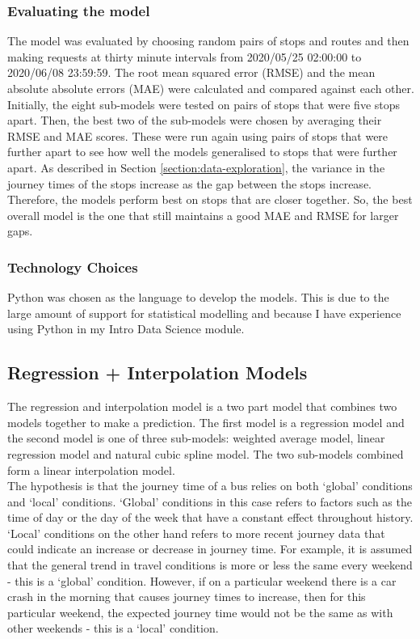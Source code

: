 \subsubsection{Evaluating the model}

The model was evaluated by choosing random pairs of stops and routes and then making requests at thirty minute intervals from 2020/05/25 02:00:00 to 2020/06/08 23:59:59. The root mean squared error (RMSE) and the mean absolute absolute errors (MAE) were calculated and compared against each other. \\

Initially, the eight sub-models were tested on pairs of stops that were five stops apart. Then, the best two of the sub-models were chosen by averaging their RMSE and MAE scores. These were run again using pairs of stops that were further apart to see how well the models generalised to stops that were further apart. As described in Section \ref{section:data-exploration}, the variance in the journey times of the stops increase as the gap between the stops increase. Therefore, the models perform best on stops that are closer together. So, the best overall model is the one that still maintains a good MAE and RMSE for larger gaps.

\subsubsection{Technology Choices}

Python was chosen as the language to develop the models. This is due to the large amount of support for statistical modelling and because I have experience using Python in my Intro Data Science module.

\subsection{Regression + Interpolation Models}

The regression and interpolation model is a two part model that combines two models together to make a prediction. The first model is a regression model and the second model is one of three sub-models: weighted average model, linear regression model and natural cubic spline model. The two sub-models combined form a linear interpolation model. \\

The hypothesis is that the journey time of a bus relies on both `global' conditions and `local' conditions. `Global' conditions in this case refers to factors such as the time of day or the day of the week that have a constant effect throughout history. `Local' conditions on the other hand refers to more recent journey data that could indicate an increase or decrease in journey time. For example, it is assumed that the general trend in travel conditions is more or less the same every weekend - this is a `global' condition. However, if on a particular weekend there is a car crash in the morning that causes journey times to increase, then for this particular weekend, the expected journey time would not be the same as with other weekends - this is a `local' condition. \\ 

